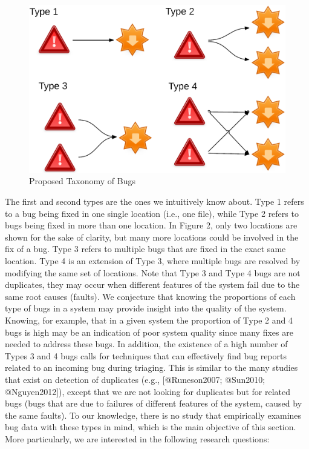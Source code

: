 \begin{figure}[h!]
  \centering
    \includegraphics[scale=0.6]{media/bug-taxo.png}
    \caption{Proposed Taxonomy of Bugs
    \label{fig:bug-taxo}}
\end{figure}

The first and second types are the ones we intuitively know about. Type
1 refers to a bug being fixed in one single location (i.e., one file),
while Type 2 refers to bugs being fixed in more than one location. In
Figure 2, only two locations are shown for the sake of clarity, but many
more locations could be involved in the fix of a bug. Type 3 refers to
multiple bugs that are fixed in the exact same location. Type 4 is an
extension of Type 3, where multiple bugs are resolved by modifying the
same set of locations. Note that Type 3 and Type 4 bugs are not
duplicates, they may occur when different features of the system fail
due to the same root causes (faults). We conjecture that knowing the
proportions of each type of bugs in a system may provide insight into
the quality of the system. Knowing, for example, that in a given system
the proportion of Type 2 and 4 bugs is high may be an indication of poor
system quality since many fixes are needed to address these bugs. In
addition, the existence of a high number of Types 3 and 4 bugs calls for
techniques that can effectively find bug reports related to an incoming
bug during triaging. This is similar to the many studies that exist on
detection of duplicates (e.g., {[}@Runeson2007; @Sun2010;
@Nguyen2012{]}), except that we are not looking for duplicates but for
related bugs (bugs that are due to failures of different features of the
system, caused by the same faults). To our knowledge, there is no study
that empirically examines bug data with these types in mind, which is
the main objective of this section. More particularly, we are interested
in the following research questions:

